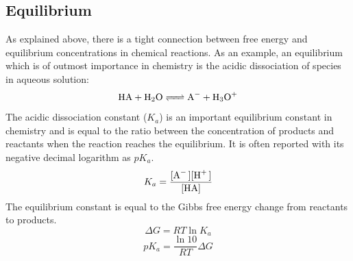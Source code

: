 \subsection*{Equilibrium}
As explained above, there is a tight connection between free energy and equilibrium concentrations in chemical reactions. As an example, an equilibrium which is of outmost importance in chemistry is the acidic dissociation of species in aqueous solution:
\[
\ce{HA + H2O <=> A- + H3O+}
\]
The acidic dissociation constant ($K_a$)  is an important equilibrium constant in chemistry and is equal to the ratio between the concentration of products and reactants when the reaction reaches the equilibrium. It is often reported with its negative decimal logarithm as $pK_a$.
\[
K_a=\dfrac{\ce{[A- ][H+ ]}}{\ce{[HA]}} 
\]
The equilibrium constant is equal to the Gibbs free energy change from reactants to products.
\[
\Delta G = RT \ln K_a
\]
\[
pK_a = \dfrac{\ln 10}{RT} \Delta G
\]

